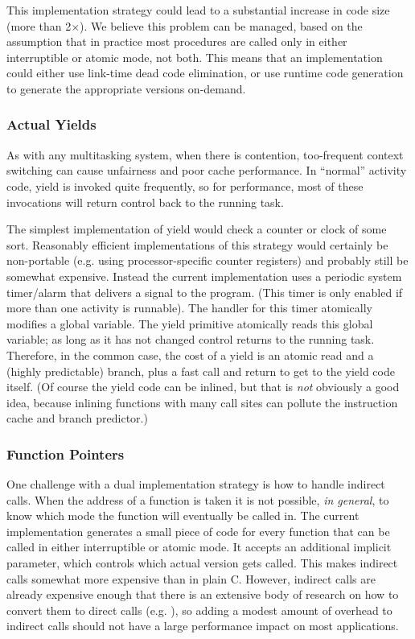 \documentclass[acmsmall,anonymous,review]{acmart}\settopmatter{printfolios=true,printccs=false,printacmref=false}
\begin{document}
This implementation strategy could lead to a substantial increase in code size (more than 2$\times$).
We believe this problem can be managed, based on the assumption that in practice most procedures are called only in either interruptible or atomic mode, not both.
This means that an implementation could either use link-time dead code elimination, or use runtime code generation to generate the appropriate versions on-demand.

\subsubsection{Actual Yields}

As with any multitasking system, when there is contention, too-frequent context switching can cause unfairness and poor cache performance.
In ``normal'' activity code, yield is invoked quite frequently, so for performance, most of these invocations will return control back to the running task.

The simplest implementation of yield would check a counter or clock of some sort.
Reasonably efficient implementations of this strategy would certainly be non-portable (e.g. using processor-specific counter registers) and probably still be somewhat expensive.
Instead the current \charcoal{} implementation uses a periodic system timer/alarm that delivers a signal to the program.
(This timer is only enabled if more than one activity is runnable).
The handler for this timer atomically modifies a global variable.
The yield primitive atomically reads this global variable; as long as it has not changed control returns to the running task.
Therefore, in the common case, the cost of a yield is an atomic read and a (highly predictable) branch, plus a fast call and return to get to the yield code itself.
(Of course the yield code can be inlined, but that is \emph{not} obviously a good idea, because inlining functions with many call sites can pollute the instruction cache and branch predictor.)

\subsubsection{Function Pointers}

One challenge with a dual implementation strategy is how to handle indirect calls.
When the address of a function is taken it is not possible, \emph{in general}, to know which mode the function will eventually be called in.
The current implementation generates a small piece of code for every function that can be called in either interruptible or atomic mode.
It accepts an additional implicit parameter, which controls which actual version gets called.
This makes indirect calls somewhat more expensive than in plain C.
However, indirect calls are already expensive enough that there is an extensive body of research on how to convert them to direct calls (e.g. \cite{Dean1995}), so adding a modest amount of overhead to indirect calls should not have a large performance impact on most applications.
\end{document}

